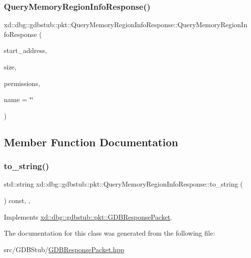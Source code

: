 \subsubsection{\texorpdfstring{Query\+Memory\+Region\+Info\+Response()}{QueryMemoryRegionInfoResponse()}}
{\footnotesize\ttfamily xd\+::dbg\+::gdbstub\+::pkt\+::\+Query\+Memory\+Region\+Info\+Response\+::\+Query\+Memory\+Region\+Info\+Response (\begin{DoxyParamCaption}\item[{\mbox{\hyperlink{namespacexd_1_1xen_a94a8d6c9448e8330c771c100dba152c3}{xd\+::xen\+::\+Address}}}]{start\+\_\+address,  }\item[{size\+\_\+t}]{size,  }\item[{\mbox{\hyperlink{structxd_1_1xen_1_1_memory_permissions}{xd\+::xen\+::\+Memory\+Permissions}}}]{permissions,  }\item[{std\+::string}]{name = {\ttfamily \char`\"{}\char`\"{}} }\end{DoxyParamCaption})\hspace{0.3cm}{\ttfamily [inline]}}



\subsection{Member Function Documentation}
\mbox{\label{classxd_1_1dbg_1_1gdbstub_1_1pkt_1_1_query_memory_region_info_response_a0206002c51a03e5782816ff2f1edbfad}} 
\subsubsection{\texorpdfstring{to\+\_\+string()}{to\_string()}}
{\footnotesize\ttfamily std\+::string xd\+::dbg\+::gdbstub\+::pkt\+::\+Query\+Memory\+Region\+Info\+Response\+::to\+\_\+string (\begin{DoxyParamCaption}{ }\end{DoxyParamCaption}) const\hspace{0.3cm}{\ttfamily [inline]}, {\ttfamily [override]}, {\ttfamily [virtual]}}



Implements \mbox{\hyperlink{classxd_1_1dbg_1_1gdbstub_1_1pkt_1_1_g_d_b_response_packet_a2a15795536cd5ff94f0533c406233874}{xd\+::dbg\+::gdbstub\+::pkt\+::\+G\+D\+B\+Response\+Packet}}.



The documentation for this class was generated from the following file\+:\begin{DoxyCompactItemize}
\item 
src/\+G\+D\+B\+Stub/\mbox{\hyperlink{_g_d_b_response_packet_8hpp}{G\+D\+B\+Response\+Packet.\+hpp}}\end{DoxyCompactItemize}
